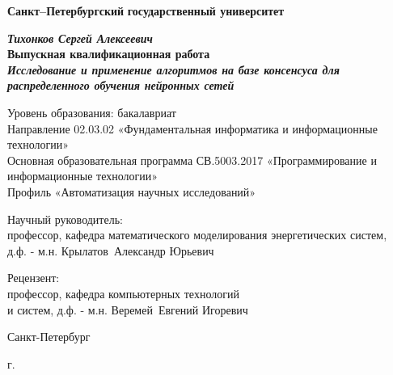 \begin{titlepage}
\begin{center}
\textbf{Санкт--Петербургский}
\textbf{государственный университет}

\vspace{35mm}

\textbf{\textit{\large Тихонков Сергей Алексеевич}} \\[8mm]
\textbf{\large Выпускная квалификационная работа}\\[3mm]
\textbf{\textit{\large Исследование и применение алгоритмов на базе консенсуса для распределенного обучения нейронных сетей}}

\vspace{20mm}
Уровень образования: бакалавриат\\
Направление 02.03.02 «Фундаментальная информатика и информационные технологии»\\
Основная образовательная программа СВ.5003.2017
«Программирование и информационные технологии»\\
Профиль «Автоматизация научных исследований»\\[30mm]


\begin{flushright}
{Научный руководитель:} \\
профессор, кафедра математического моделирования энергетических систем, \\ д.ф. - м.н.  Крылатов~Александр Юрьевич
\end{flushright}
\begin{flushright}
{Рецензент:} \\
профессор, кафедра компьютерных технологий \\и систем, д.ф. - м.н.  Веремей~Евгений Игоревич
\end{flushright}

\vfill 

{Санкт-Петербург}
\par{\the\year{} г.}
\end{center}
\end{titlepage}
\restoregeometry
\addtocounter{page}{1}
